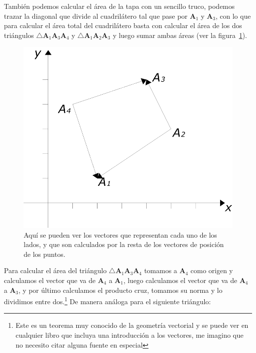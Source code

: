También podemos calcular el área de la tapa con un sencillo truco, podemos trazar la diagonal que divide al cuadrilátero tal que pase por $\textbf{A}_1$ y $\textbf{A}_3$, con lo que para calcular el área total del cuadrilátero basta con calcular el área de los dos triángulos $\bigtriangleup \textbf{A}_1 \textbf{A}_3 \textbf{A}_4$ y $\bigtriangleup \textbf{A}_1 \textbf{A}_2 \textbf{A}_3$ y luego sumar ambas áreas (ver la figura~\ref{vectorArista:fig}).

\begin{figure}
 \centering
 \includegraphics[]{Img/vectores_cuerpo}
 \caption[Cálculo del área de un caudrilátero]{ 
Aquí se pueden ver los vectores que representan cada uno de los lados, y que son calculados por la resta de los vectores de posición de los puntos.
 } \label{vectorArista:fig}
\end{figure}

Para calcular el área del triángulo $\bigtriangleup \textbf{A}_1 \textbf{A}_3 \textbf{A}_4$ tomamos a $\textbf{A}_4$ como origen y calculamos el vector que va de $\textbf{A}_4$ a $\textbf{A}_1$, luego calculamos el vector que va de $\textbf{A}_4$ a $\textbf{A}_3$, y por último calculamos el producto cruz, tomamos su norma y lo dividimos entre dos.\footnote{Este es un teorema muy conocido de la geometría vectorial y se puede ver en cualquier libro que incluya una introducción a los vectores, me imagino que no necesito citar alguna fuente en especial}
De manera análoga para el siguiente triángulo:

